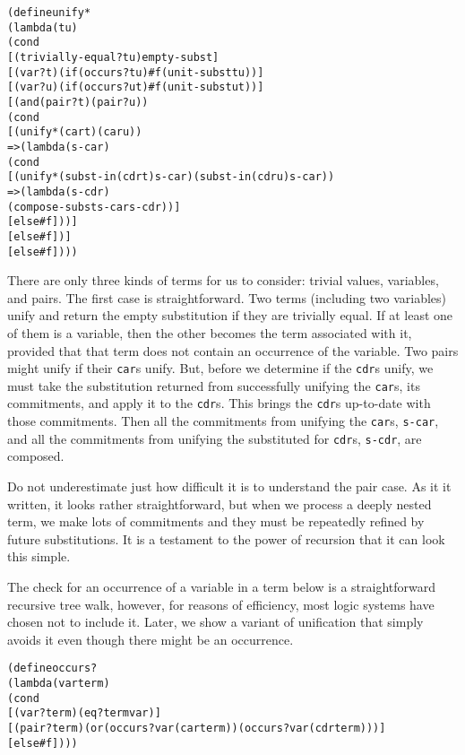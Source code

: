 \begin{alltt}
(define unify*
  (lambda (t u)
    (cond
      [(trivially-equal? t u) empty-subst]
      [(var? t) (if (occurs? t u) #f (unit-subst t u))]
      [(var? u) (if (occurs? u t) #f (unit-subst u t))]
      [(and (pair? t) (pair? u))
       (cond
         [(unify* (car t) (car u))
           => (lambda (s-car)
                (cond
                  [(unify* (subst-in (cdr t) s-car) (subst-in (cdr u) s-car))
                   => (lambda (s-cdr)
                        (compose-subst s-car s-cdr))]
                  [else #f]))]
         [else #f])]
      [else #f])))
\end{alltt}
There are only three kinds of terms for us to consider: trivial
values, variables, and pairs.  The first case is straightforward.  Two
terms (including two variables) unify and return the empty
substitution if they are trivially equal.  If at least one of them is
a variable, then the other becomes the term associated with it,
provided that that term does not contain an occurrence of the
variable.  Two pairs might unify if their \texttt{car}s unify.  But,
before we determine if the \texttt{cdr}s unify, we must take the
substitution returned from successfully unifying the \texttt{car}s,
its commitments, and apply it to the \texttt{cdr}s.  This brings the
\texttt{cdr}s up-to-date with those commitments.  Then all the
commitments from unifying the \texttt{car}s, \texttt{s-car}, and all
the commitments from unifying the substituted for \texttt{cdr}s,
\texttt{s-cdr}, are composed.

Do not underestimate just how difficult it is to understand the pair
case.  As it it written, it looks rather straightforward, but when we
process a deeply nested term, we make lots of commitments and they
must be repeatedly refined by future substitutions.  It is a testament
to the power of recursion that it can look this simple.

The check for an occurrence of a variable in a term below is a
straightforward recursive tree walk, however, for reasons of efficiency,
most logic systems have chosen not to include it.  Later, we show a
variant of unification that simply avoids it even though there might
be an occurrence.

\begin{alltt}
(define occurs?
  (lambda (var term)
    (cond
      [(var? term) (eq? term var)]
      [(pair? term) (or (occurs? var (car term)) (occurs? var (cdr term)))]
      [else #f])))
\end{alltt}

